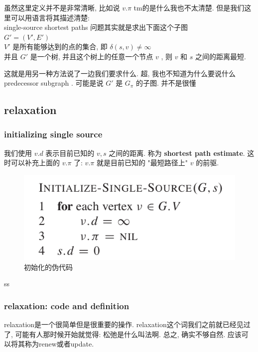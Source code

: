\documentclass[a4paper, 10pt]{ctexart} %
\begin{document}
虽然这里定义并不是非常清晰, 比如说 $v.\pi$ tm的是什么我也不太清楚. 但是我们这里可以用语言将其描述清楚:
\\ [8pt]
\noindent single-source shortest paths 问题其实就是求出下面这个子图 
\\$G'  = \left(V '  , E'\right)$ \\ $V'$ 是所有能够达到的点的集合, 即 $\delta \left(s , v\right) \ne \infty$
\\并且 $G'$ 是一个树, 并且这个树上的任意一个节点 $v$ , 则 $v$ 和 $s$ 之间的距离最短. 

这就是用另一种方法说了一边我们要求什么. 
超, 我也不知道为什么要说什么 predecessor subgraph . 可能是说 $G'$ 是 $G_{\pi    }$ 的子图. 并不是很懂
\subsection{relaxation}
\subsubsection{initializing single source}
我们使用 $v.d$ 表示目前已知的 $v, s$ 之间的距离. 称为 \textbf{shortest path estimate}. 这时可以补充上面的 $v.\pi$ 了: $v.\pi$ 就是目前已知的 "最短路径上" $v$ 的前驱.

\begin{figure}[H]
    \centering
    \includegraphics[scale = 0.5]{sssp2.png}
    \caption{初始化的伪代码}
    \label{iss}
\end{figure}
ss

\subsubsection{relaxation: code and definition}

relaxation是一个很简单但是很重要的操作. relaxation这个词我们之前就已经见过了, 可能有人那时候开始就觉得: 
松弛是什么叫法啊. 总之, 确实不够自然. 
应该可以将其称为renew或者update. 
\end{document}
